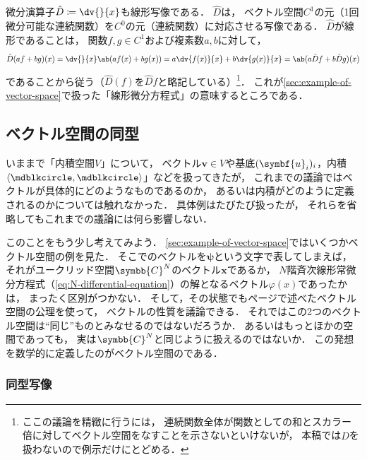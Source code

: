 \documentclass[
]{sotsu}
\newcommand{\bpsi}{\symbf{\psi}}
\begin{document}
微分演算子$\hat{D} \coloneq \dv{}{x}$も線形写像である．
$\hat{D}$は，
ベクトル空間$C^1$の元（1回微分可能な連続関数）を$C^0$の元（連続関数）に対応させる写像である．
$\hat{D}$が線形であることは，
関数$f, g \in C^1$および複素数$a, b$に対して，
\begin{equation*}
    \hat{D}(af + bg)(x) = \dv{}{x} \ab(a f(x) + b g(x))
        = a \dv{f(x)}{x} + b \dv{g(x)}{x}
        = \ab( a \hat{D}f + b \hat{D}g )(x)
\end{equation*}
であることから従う（$\hat{D}(f)$を$\hat{D}f$と略記している）\footnote{
    ここの議論を精緻に行うには，
    連続関数全体が関数としての和とスカラー倍に対してベクトル空間をなすことを示さないといけないが，
    本稿では$\hat{D}$を扱わないので例示だけにとどめる．
}．
これが\cref{sec:example-of-vector-space}で扱った「線形微分方程式」の意味するところである．




\subsection{ベクトル空間の同型}
\label{sec:isomorphic}

いままで「内積空間$V$」について，
ベクトル$\symbf{v} \in V$や基底$\sequ{\symbf{u}_i}[i]$，内積$\iparen{\bigdot, \bigdot}$」などを扱ってきたが，
これまでの議論ではベクトルが具体的にどのようなものであるのか，
あるいは内積がどのように定義されるのかについては触れなかった．
具体例はたびたび扱ったが，
それらを省略してもこれまでの議論には何ら影響しない．

このことをもう少し考えてみよう．
\cref{sec:example-of-vector-space}ではいくつかベクトル空間の例を見た．
そこでのベクトルを$\bpsi$という文字で表してしまえば，
それがユークリッド空間$\symbb{C}^N$のベクトル$\symbf{x}$であるか，
$N$階斉次線形常微分方程式（\cref{eq:N-differential-equation}）の解となるベクトル$\varphi(x)$であったかは，
まったく区別がつかない．
そして，その状態でも\pageref{sec:definition-of-vector-space}ページで述べたベクトル空間の公理を使って，
ベクトルの性質を議論できる．
それではこの2つのベクトル空間は``同じ''ものとみなせるのではないだろうか．
あるいはもっとほかの空間であっても，
実は$\symbb{C}^N$と同じように扱えるのではないか．
この発想を数学的に定義したのがベクトル空間のである．



\subsubsection{同型写像}
\end{document}
